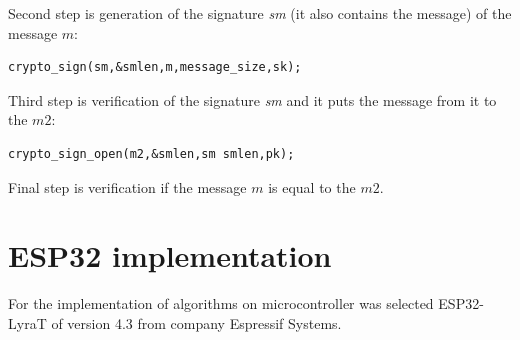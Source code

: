 \documentclass[thesis=M,english]{FITthesis}[2019/12/23]
\begin{document}
\bigskip
\noindent
Second step is generation of the signature \textit{sm} (it also contains the message) of the message $m$:
\begin{lstlisting}[frame=single]
crypto_sign(sm,&smlen,m,message_size,sk);
\end{lstlisting}

\bigskip
\noindent
Third step is verification of the signature \textit{sm} and it puts the message from it to the $m2$:
\begin{lstlisting}[frame=single]
crypto_sign_open(m2,&smlen,sm smlen,pk);
\end{lstlisting}

\noindent
Final step is verification if the message $m$ is equal to the $m2$.

\newpage
\section{ESP32 implementation} \label{ESP32_impl}
For the implementation of algorithms on microcontroller was selected ESP32-LyraT of version 4.3 from company Espressif Systems.
\end{document}
